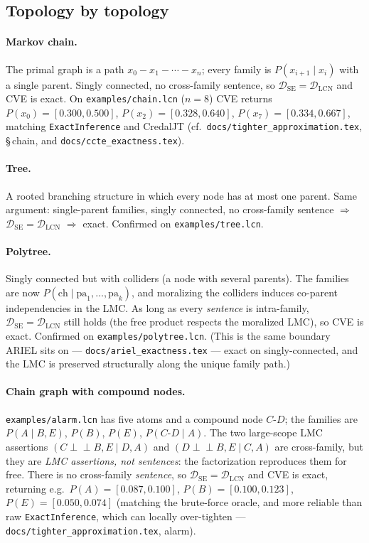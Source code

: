 \documentclass[11pt]{article}
\newcommand{\indep}{\perp\!\!\!\perp}
\newcommand{\DSE}{\mathcal{D}_{\mathrm{SE}}}
\newcommand{\DLCN}{\mathcal{D}_{\mathrm{LCN}}}
\begin{document}
\subsection{Topology by topology}\label{sec:topo}

\paragraph{Markov chain.} The primal graph is a path $x_0\!-\!x_1\!-\!\cdots\!-\!x_n$; every family is
$P(x_{i+1}\mid x_i)$ with a single parent. Singly connected, no cross-family sentence, so
$\DSE=\DLCN$ and CVE is exact. On \texttt{examples/chain.lcn} ($n=8$) CVE returns
$P(x_0)=[0.300,0.500]$, $P(x_2)=[0.328,0.640]$, $P(x_7)=[0.334,0.667]$, matching
\texttt{ExactInference} and CredalJT (cf.\ \texttt{docs/tighter\_approximation.tex},
\S\,chain, and \texttt{docs/ccte\_exactness.tex}).

\paragraph{Tree.} A rooted branching structure in which every node has at most one parent. Same
argument: single-parent families, singly connected, no cross-family sentence $\Rightarrow$
$\DSE=\DLCN$ $\Rightarrow$ exact. Confirmed on \texttt{examples/tree.lcn}.

\paragraph{Polytree.} Singly connected but with colliders (a node with several parents). The
families are now $P(\mathrm{ch}\mid\mathrm{pa}_1,\dots,\mathrm{pa}_k)$, and moralizing the colliders
induces co-parent independencies in the LMC. As long as every \emph{sentence} is intra-family,
$\DSE=\DLCN$ still holds (the free product respects the moralized LMC), so CVE is exact. Confirmed on
\texttt{examples/polytree.lcn}. (This is the same boundary ARIEL sits on ---
\texttt{docs/ariel\_exactness.tex} --- exact on singly-connected, and the LMC is preserved
structurally along the unique family path.)

\paragraph{Chain graph with compound nodes.} \texttt{examples/alarm.lcn} has five atoms and a
compound node $C\text{-}D$; the families are $P(A\mid B,E)$, $P(B)$, $P(E)$, $P(C\text{-}D\mid A)$.
The two large-scope LMC assertions $(C\indep B,E\mid D,A)$ and $(D\indep B,E\mid C,A)$ are
cross-family, but they are \emph{LMC assertions, not sentences}: the factorization reproduces them
for free. There is no cross-family \emph{sentence}, so $\DSE=\DLCN$ and CVE is exact, returning e.g.\
$P(A)=[0.087,0.100]$, $P(B)=[0.100,0.123]$, $P(E)=[0.050,0.074]$ (matching the brute-force oracle,
and more reliable than raw \texttt{ExactInference}, which can locally over-tighten ---
\texttt{docs/tighter\_approximation.tex}, alarm).
\end{document}
